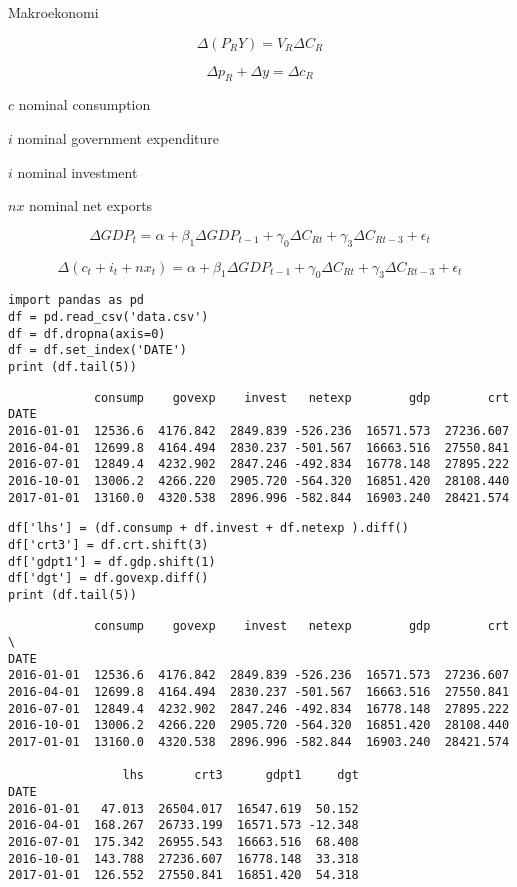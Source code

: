 \documentclass[12pt,fleqn]{article}\usepackage{../../common}
\begin{document}
Makroekonomi

$$ \Delta (P_RY) = V_R\Delta C_R$$

$$ \Delta p_R + \Delta y = \Delta c_R$$




$c$ nominal consumption 

$i$ nominal government expenditure

$i$ nominal investment 

$nx$ nominal net exports

$$ \Delta GDP_t = 
\alpha + \beta_1 \Delta GDP_{t-1} + 
\gamma_0 \Delta C_{Rt} + \gamma_3 \Delta C_{Rt-3} + \epsilon_t 
$$

$$ 
\Delta (c_t + i_t + nx_t) = 
\alpha + \beta_1 \Delta GDP_{t-1} + 
\gamma_0 \Delta C_{Rt} + \gamma_3 \Delta C_{Rt-3} + \epsilon_t 
$$


\begin{verbatim}
import pandas as pd
df = pd.read_csv('data.csv')
df = df.dropna(axis=0)
df = df.set_index('DATE')
print (df.tail(5))
\end{verbatim}

\begin{verbatim}
            consump    govexp    invest   netexp        gdp        crt
DATE                                                                  
2016-01-01  12536.6  4176.842  2849.839 -526.236  16571.573  27236.607
2016-04-01  12699.8  4164.494  2830.237 -501.567  16663.516  27550.841
2016-07-01  12849.4  4232.902  2847.246 -492.834  16778.148  27895.222
2016-10-01  13006.2  4266.220  2905.720 -564.320  16851.420  28108.440
2017-01-01  13160.0  4320.538  2896.996 -582.844  16903.240  28421.574
\end{verbatim}

\begin{verbatim}
df['lhs'] = (df.consump + df.invest + df.netexp ).diff()
df['crt3'] = df.crt.shift(3)
df['gdpt1'] = df.gdp.shift(1)
df['dgt'] = df.govexp.diff()
print (df.tail(5))
\end{verbatim}

\begin{verbatim}
            consump    govexp    invest   netexp        gdp        crt  \
DATE                                                                     
2016-01-01  12536.6  4176.842  2849.839 -526.236  16571.573  27236.607   
2016-04-01  12699.8  4164.494  2830.237 -501.567  16663.516  27550.841   
2016-07-01  12849.4  4232.902  2847.246 -492.834  16778.148  27895.222   
2016-10-01  13006.2  4266.220  2905.720 -564.320  16851.420  28108.440   
2017-01-01  13160.0  4320.538  2896.996 -582.844  16903.240  28421.574   

                lhs       crt3      gdpt1     dgt  
DATE                                               
2016-01-01   47.013  26504.017  16547.619  50.152  
2016-04-01  168.267  26733.199  16571.573 -12.348  
2016-07-01  175.342  26955.543  16663.516  68.408  
2016-10-01  143.788  27236.607  16778.148  33.318  
2017-01-01  126.552  27550.841  16851.420  54.318  
\end{verbatim}
\end{document}
